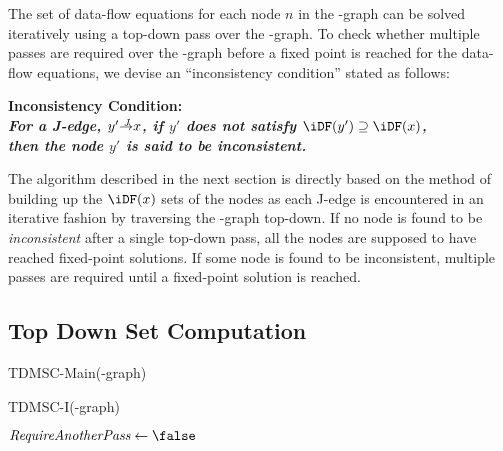 {The set of data-flow equations for each node $n$ in the \DJ-graph can be solved iteratively using a top-down pass over the \DJ-graph. 
To check whether multiple passes are required over the \DJ-graph before a fixed point is reached for the data-flow equations, we devise an ``inconsistency condition'' stated as follows:

\begin{center} \bf{Inconsistency Condition:}\\ \it{For a J-edge, $y' \st{J} x$, if $y'$ does not satisfy $\iDF(y')\supseteq \iDF(x)$,\\ then the node $y'$ is said to be inconsistent}. 
\end{center}

The algorithm described in the next section is directly based on the method of building up the $\iDF(x)$ sets of the nodes as each J-edge is encountered in an iterative fashion by traversing the \DJ-graph top-down. 
If no node is found to be \emph{inconsistent} after a single top-down pass, all the nodes are supposed to have reached fixed-point solutions. 
If some node is found to be inconsistent, multiple passes are required until a fixed-point solution is reached.


\subsection{Top Down \iDF Set Computation}

\begin{function}
  \caption{TDMSC-Main(\DJ-graph)}
  \label{proc:tdmscmain}
\end{function}

\begin{function}
  \caption{TDMSC-I(\DJ-graph)}
  \label{proc:alt:tdmscI}
  $\textit{RequireAnotherPass} \gets \false$\;

\end{function}



}
